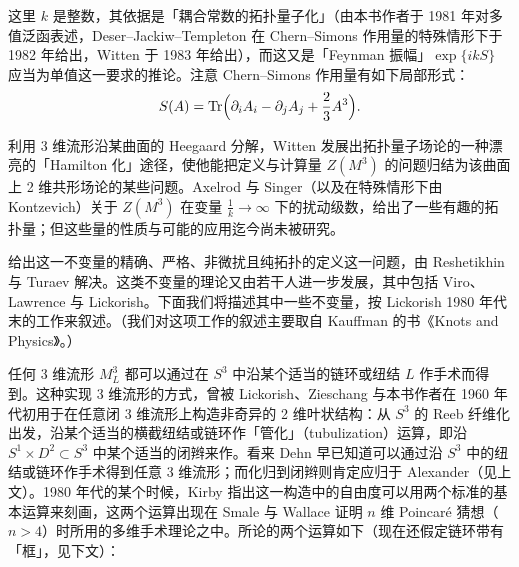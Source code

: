 
这里 $k$ 是整数，其依据是「耦合常数的拓扑量子化」（由本书作者于 1981 年对多值泛函表述，Deser--Jackiw--Templeton 在 Chern--Simons 作用量的特殊情形下于 1982 年给出，Witten 于 1983 年给出），而这又是「Feynman 振幅」$\exp\{ikS\}$ 应当为单值这一要求的推论。注意 Chern--Simons 作用量有如下局部形式：
\[
S(A)=\operatorname{Tr}\Bigl(\partial_iA_i-\partial_jA_j+\frac23A^3\Bigr).
\]


利用 3 维流形沿某曲面的 Heegaard 分解，Witten 发展出拓扑量子场论的一种漂亮的「Hamilton 化」途径，使他能把定义与计算量 $Z(M^3)$ 的问题归结为该曲面上 2 维共形场论的某些问题。Axelrod 与 Singer（以及在特殊情形下由 Kontzevich）关于 $Z(M^3)$ 在变量 $\frac1k\to\infty$ 下的扰动级数，给出了一些有趣的拓扑量；但这些量的性质与可能的应用迄今尚未被研究。

给出这一不变量的精确、严格、非微扰且纯拓扑的定义这一问题，由 Reshetikhin 与 Turaev 解决。这类不变量的理论又由若干人进一步发展，其中包括 Viro、Lawrence 与 Lickorish。下面我们将描述其中一些不变量，按 Lickorish 1980 年代末的工作来叙述。（我们对这项工作的叙述主要取自 Kauffman 的书《Knots and Physics》。）

任何 3 维流形 $M_L^3$ 都可以通过在 $S^3$ 中沿某个适当的链环或纽结 $L$ 作手术而得到。这种实现 3 维流形的方式，曾被 Lickorish、Zieschang 与本书作者在 1960 年代初用于在任意闭 3 维流形上构造非奇异的 2 维叶状结构：从 $S^3$ 的 Reeb 纤维化出发，沿某个适当的横截纽结或链环作「管化」（tubulization）运算，即沿 $S^1\times D^2\subset S^3$ 中某个适当的闭辫来作。看来 Dehn 早已知道可以通过沿 $S^3$ 中的纽结或链环作手术得到任意 3 维流形；而化归到闭辫则肯定应归于 Alexander（见上文）。1980 年代的某个时候，Kirby 指出这一构造中的自由度可以用两个标准的基本运算来刻画，这两个运算出现在 Smale 与 Wallace 证明 $n$ 维 Poincaré 猜想（$n>4$）时所用的多维手术理论之中。所论的两个运算如下（现在还假定链环带有「框」，见下文）：

